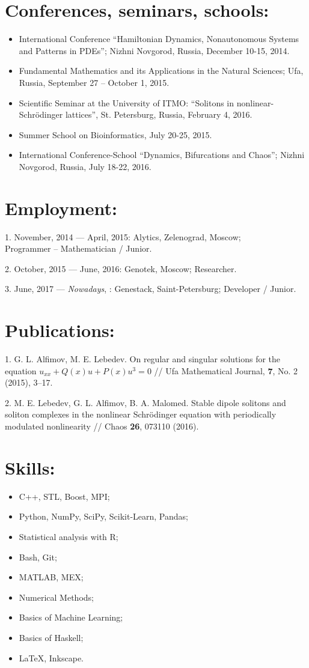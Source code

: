 \documentclass[margin, 10pt]{res} %
\begin{document}
\begin{resume}
\section{Conferences, seminars, schools:}
\begin{itemize}
\item International Conference ``Hamiltonian Dynamics, Nonautonomous Systems and Patterns in PDEs''; Nizhni Novgorod, Russia, December 10-15, 2014.
\item Fundamental Mathematics and its Applications in the Natural Sciences; Ufa, Russia, September 27 -- October 1, 2015.
\item Scientific Seminar at the University of ITMO: ``Solitons in nonlinear-Schr\"odinger lattices'', St. Petersburg, Russia, February 4, 2016.
\item Summer School on Bioinformatics, July 20-25, 2015.
\item International Conference-School ``Dynamics, Bifurcations and Chaos''; Nizhni Novgorod, Russia, July 18-22, 2016.
\end{itemize}

\section{Employment:}
1. November, 2014 --- April, 2015: Alytics, Zelenograd, Moscow; \\ Programmer -- Mathematician / Junior.

2. October, 2015 --- June, 2016: Genotek, Moscow; Researcher.

3. June, 2017 --- {\it Nowadays}, : Genestack, Saint-Petersburg; Developer / Junior.

\section{Publications:}
1. G. L. Alfimov, M. E. Lebedev. On regular and singular solutions for the equation $u_{xx} + Q(x)u + P(x)u^3 = 0$ // Ufa Mathematical Journal, {\bf 7}, No. 2 (2015), 3--17. 

2. M. E. Lebedev, G. L. Alfimov, B. A. Malomed. Stable dipole solitons and soliton complexes in the nonlinear Schr\"odinger equation with periodically modulated nonlinearity // Chaos {\bf 26}, 073110 (2016).

\section{Skills:}
\begin{itemize}
\item C++, STL, Boost, MPI;
\item Python, NumPy, SciPy, Scikit-Learn, Pandas;
\item Statistical analysis with R;
\item Bash, Git;
\item MATLAB, MEX;
\item Numerical Methods;
\item Basics of Machine Learning;
\item Basics of Haskell;
\item LaTeX, Inkscape.
\end{itemize}


\end{resume}
\end{document}
